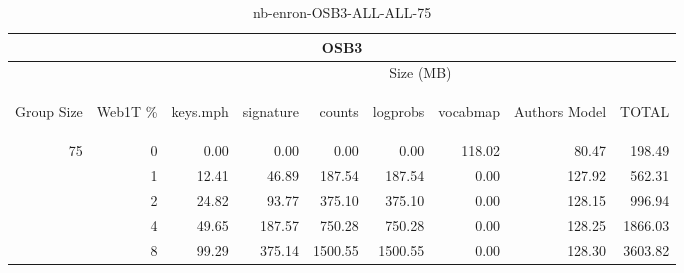 \begin{center}
\begin{table}[htbp] 
 \begin{center}
\begin{tabular}{ | r | r | r | r | r | r | r | r | r |}
\hline
\multicolumn{9}{|c|}{OSB3}\\
\hline
 & & \multicolumn{7}{|c|}{Size (MB)}\\ \cline{3-9}
\begin{sideways}Group Size\end{sideways} & \begin{sideways}Web1T \% \end{sideways} & \begin{sideways}keys.mph\end{sideways} & \begin{sideways}signature\end{sideways} & \begin{sideways}counts\end{sideways} & \begin{sideways}logprobs\end{sideways} & \begin{sideways}vocabmap\end{sideways} & \begin{sideways}Authors Model \end{sideways} & \begin{sideways}TOTAL\end{sideways}\\
\hline
\multirow{4}{*}{75}
 & 0 & 0.00 & 0.00 & 0.00 & 0.00 & 118.02 & 80.47 & 198.49\\ \cline{2-9}
 & 1 & 12.41 & 46.89 & 187.54 & 187.54 & 0.00 & 127.92 & 562.31\\ \cline{2-9}
 & 2 & 24.82 & 93.77 & 375.10 & 375.10 & 0.00 & 128.15 & 996.94\\ \cline{2-9}
 & 4 & 49.65 & 187.57 & 750.28 & 750.28 & 0.00 & 128.25 & 1866.03\\ \cline{2-9}
 & 8 & 99.29 & 375.14 & 1500.55 & 1500.55 & 0.00 & 128.30 & 3603.82\\ \cline{2-9}
\hline
\end{tabular}
\caption{nb-enron-OSB3-ALL-ALL-75}
\label{table:nb-enron-OSB3-ALL-ALL-75}
\end{center}
 \end{table}
\end{center}

